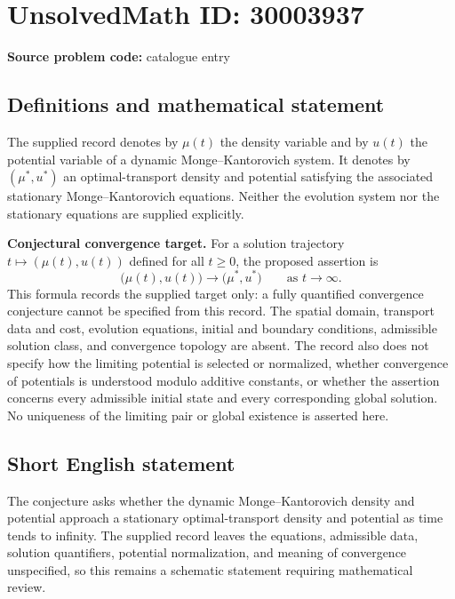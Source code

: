 \documentclass[11pt]{article}
\begin{document}
\section*{UnsolvedMath ID: 30003937}
\textbf{Source problem code:} catalogue entry
\subsection{Definitions and mathematical statement}
The supplied record denotes by \(\mu(t)\) the density variable and by \(u(t)\) the potential variable of a dynamic Monge--Kantorovich system. It denotes by \((\mu^*,u^*)\) an optimal-transport density and potential satisfying the associated stationary Monge--Kantorovich equations. Neither the evolution system nor the stationary equations are supplied explicitly.

\textbf{Conjectural convergence target.} For a solution trajectory \(t\mapsto(\mu(t),u(t))\) defined for all \(t\geq 0\), the proposed assertion is
\[
\bigl(\mu(t),u(t)\bigr)\longrightarrow\bigl(\mu^*,u^*\bigr)
\qquad\text{as }t\to\infty.
\]
This formula records the supplied target only: a fully quantified convergence conjecture cannot be specified from this record. The spatial domain, transport data and cost, evolution equations, initial and boundary conditions, admissible solution class, and convergence topology are absent. The record also does not specify how the limiting potential is selected or normalized, whether convergence of potentials is understood modulo additive constants, or whether the assertion concerns every admissible initial state and every corresponding global solution. No uniqueness of the limiting pair or global existence is asserted here.
\subsection{Short English statement}
The conjecture asks whether the dynamic Monge--Kantorovich density and potential approach a stationary optimal-transport density and potential as time tends to infinity. The supplied record leaves the equations, admissible data, solution quantifiers, potential normalization, and meaning of convergence unspecified, so this remains a schematic statement requiring mathematical review.
\end{document}
